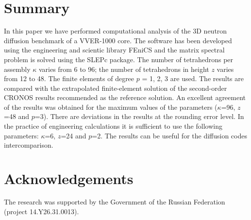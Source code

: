 \documentclass[runningheads,a4paper]{llncs}
\begin{document}
\section{Summary}
In this paper we have performed computational analysis of the 3D neutron diffusion benchmark of a VVER-1000 core. The software has been developed using the engineering and scientic library FEniCS and the matrix spectral problem is solved using the SLEPc package. The number of tetrahedrons per assembly $\kappa$ varies from 6 to 96; the number of tetrahedrons in height $z$ varies from 12 to 48. The finite elements of degree $p$ = 1, 2, 3 are used. The results are compared with the extrapolated finite-element solution of the second-order CRONOS results recommended as the reference solution. An excellent agreement of the results was obtained for the maximum values of the parameters ($\kappa$=96, $z$=48 and $p$=3). There are deviations in the results at the rounding error level. In the practice of engineering calculations it is sufficient to use the following parameters: $\kappa$=6, $z$=24 and $p$=2. The results can be useful for the diffusion codes intercomparison.

\section{Acknowledgements}
The research was supported by the Government of the Russian Federation (project 14.Y26.31.0013).
\end{document}
